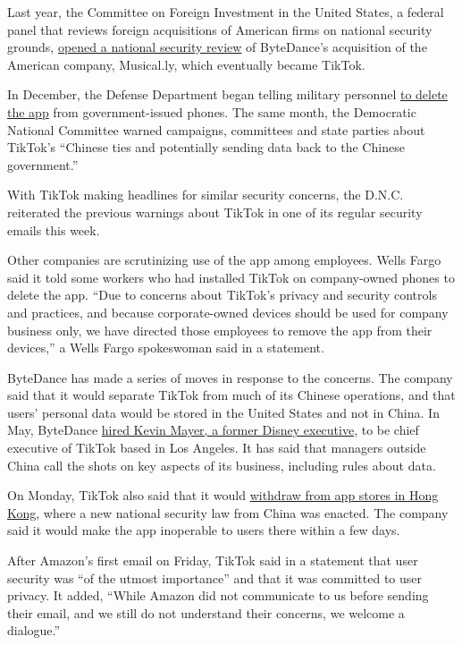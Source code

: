 Last year, the Committee on Foreign Investment in the United States, a
federal panel that reviews foreign acquisitions of American firms on
national security grounds,
\href{https://www.nytimes3xbfgragh.onion/2019/11/01/technology/tiktok-national-security-review.html}{opened
a national security review} of ByteDance's acquisition of the American
company, Musical.ly, which eventually became TikTok.

In December, the Defense Department began telling military personnel
\href{https://www.nytimes3xbfgragh.onion/2020/01/04/us/tiktok-pentagon-military-ban.html}{to
delete the app} from government-issued phones. The same month, the
Democratic National Committee warned campaigns, committees and state
parties about TikTok's ``Chinese ties and potentially sending data back
to the Chinese government.''

With TikTok making headlines for similar security concerns, the D.N.C.
reiterated the previous warnings about TikTok in one of its regular
security emails this week.

Other companies are scrutinizing use of the app among employees. Wells
Fargo said it told some workers who had installed TikTok on
company-owned phones to delete the app. ``Due to concerns about TikTok's
privacy and security controls and practices, and because corporate-owned
devices should be used for company business only, we have directed those
employees to remove the app from their devices,'' a Wells Fargo
spokeswoman said in a statement.

ByteDance has made a series of moves in response to the concerns. The
company said that it would separate TikTok from much of its Chinese
operations, and that users' personal data would be stored in the United
States and not in China. In May, ByteDance
\href{https://www.nytimes3xbfgragh.onion/2020/05/18/business/media/tiktok-ceo-kevin-mayer.html}{hired
Kevin Mayer, a former Disney executive}, to be chief executive of TikTok
based in Los Angeles. It has said that managers outside China call the
shots on key aspects of its business, including rules about data.

On Monday, TikTok also said that it would
\href{https://www.nytimes3xbfgragh.onion/2020/07/07/business/hong-kong-security-law-tech.html}{withdraw
from app stores in Hong Kong}, where a new national security law from
China was enacted. The company said it would make the app inoperable to
users there within a few days.

After Amazon's first email on Friday, TikTok said in a statement that
user security was ``of the utmost importance'' and that it was committed
to user privacy. It added, ``While Amazon did not communicate to us
before sending their email, and we still do not understand their
concerns, we welcome a dialogue.''

